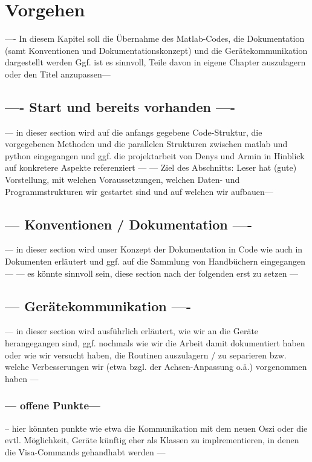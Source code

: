 \documentclass[../Report.tex]{subfiles}
\begin{document}
\chapter{Vorgehen}
\label{chap:vorgehen}
---- In diesem Kapitel soll die Übernahme des Matlab-Codes, die Dokumentation (samt Konventionen und Dokumentationskonzept) und die Gerätekommunikation dargestellt werden 
Ggf. ist es sinnvoll, Teile davon in eigene Chapter auszulagern oder den Titel anzupassen--- 

\section[---setup ---]{---- Start und bereits vorhanden  ----}
\label{sec:vorg.setup}
--- in dieser section wird auf die anfangs gegebene Code-Struktur, die vorgegebenen Methoden und die parallelen Strukturen zwischen matlab und python eingegangen und ggf. die projektarbeit von Denys und Armin in Hinblick auf konkretere Aspekte referenziert ---
--- Ziel des Abschnitts: Leser hat (gute) Vorstellung, mit welchen Voraussetzungen, welchen Daten- und Programmstrukturen wir gestartet sind und auf welchen wir aufbauen---


\section{ --- Konventionen / Dokumentation ---- }
\label{sec:vorg.doku}
--- in dieser section wird unser Konzept der Dokumentation in Code wie auch in Dokumenten erläutert und ggf. auf die Sammlung von Handbüchern eingegangen --- 
--- es könnte sinnvoll sein, diese section nach der folgenden erst zu setzen --- 

\section{ --- Gerätekommunikation ---- }
\label{sec:vorg.geraete}
--- in dieser section wird ausführlich erläutert, wie wir an die Geräte herangegangen sind, ggf. nochmals wie wir die Arbeit damit dokumentiert haben oder wie wir versucht haben, die Routinen auszulagern / zu separieren bzw. welche Verbesserungen wir (etwa bzgl. der Achsen-Anpassung o.ä.) vorgenommen haben   --- 
\\

\subsection{--- offene Punkte---}
\label{subsec:vorg.geraete.open}
-- hier könnten punkte wie etwa die Kommunikation mit dem neuen Oszi oder die evtl. Möglichkeit, Geräte künftig eher als Klassen zu implrementieren, in denen die Visa-Commands gehandhabt werden --- 
\end{document}
